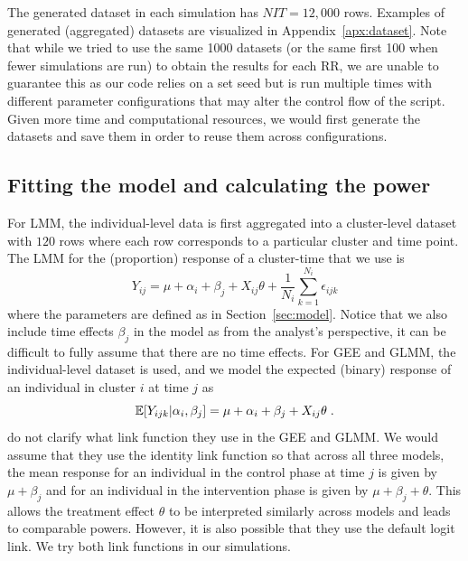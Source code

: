 \documentclass[10pt]{article}
\begin{document}
The generated dataset in each simulation has $NIT=12,\!000$ rows. Examples of generated (aggregated) datasets are visualized in Appendix~\ref{apx:dataset}. Note that while we tried to use the same 1000 datasets (or the same first 100 when fewer simulations are run) to obtain the results for each RR, we are unable to guarantee this as our code relies on a set seed but is run multiple times with different parameter configurations that may alter the control flow of the script. Given more time and computational resources, we would first generate the datasets and save them in order to reuse them across configurations.

\subsection{Fitting the model and calculating the power} \label{sec:sim:power}

For LMM, the individual-level data is first aggregated into a cluster-level dataset with $120$ rows where each row corresponds to a particular cluster and time point. The LMM for the (proportion) response of a cluster-time that we use is
\[
Y_{ij} = \mu + \alpha_i + \beta_j + X_{ij}\theta + \frac{1}{N_i}\sum_{k=1}^{N_i}\epsilon_{ijk}
\]
where the parameters are defined as in Section~\ref{sec:model}. Notice that we also include time effects $\beta_j$ in the model as from the analyst's perspective, it can be difficult to fully assume that there are no time effects. For GEE and GLMM, the individual-level dataset is used, and we model the expected (binary) response of an individual in cluster $i$ at time $j$ as
\[
\mathbb{E}[Y_{ijk}|\alpha_i,\beta_j] = \mu + \alpha_i + \beta_j + X_{ij}\theta \;.
\]
\citeauthor{Hussey:2007} do not clarify what link function they use in the GEE and GLMM. We would assume that they use the identity link function so that across all three models, the mean response for an individual in the control phase at time $j$ is given by $\mu + \beta_j$ and for an individual in the intervention phase is given by $\mu+\beta_j+\theta$. This allows the treatment effect $\theta$ to be interpreted similarly across models and leads to comparable powers. However, it is also possible that they use the default logit link. We try both link functions in our simulations.
\\
\end{document}
